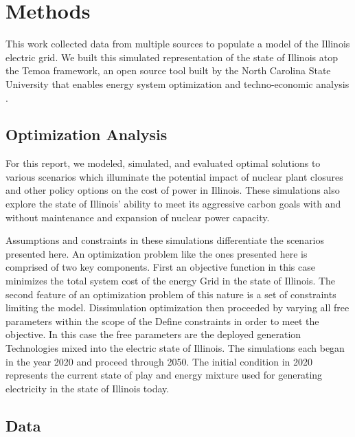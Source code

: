 \section{Methods}

This work collected data from multiple sources to populate a model of the 
Illinois electric grid. We built this simulated representation of the state of 
Illinois atop the Temoa framework, an open source tool built by the North 
Carolina State University that enables energy system optimization and 
techno-economic analysis 
\cite{decarolis_temoa_2010,decarolis_modelling_2016,decarolis_formalizing_2017}.

\subsection{Optimization Analysis}
For this report, we modeled, simulated, and evaluated optimal solutions to 
various scenarios which illuminate the potential impact of nuclear plant 
closures and other policy options on the cost of power in Illinois. These 
simulations  also explore the state of Illinois' ability to meet its aggressive 
carbon goals with and without maintenance and expansion of nuclear power 
capacity. 

Assumptions and constraints in these simulations differentiate the scenarios 
presented here. An optimization problem like the ones presented here is 
comprised of two key components. First an objective function in this case 
minimizes the total system cost of the energy Grid in the state of Illinois. 
The second feature of an optimization problem of this nature is a set of 
constraints limiting the model. Dissimulation optimization then proceeded by 
varying all free parameters within the scope of the Define constraints in order 
to meet the objective. In this case the free parameters are the deployed 
generation Technologies mixed into the electric state of Illinois. The 
simulations each began in the year 2020 and proceed through 2050. The initial 
condition in 2020 represents the current state of play and energy mixture used 
for generating electricity in the state of Illinois today.

\subsection{Data}

